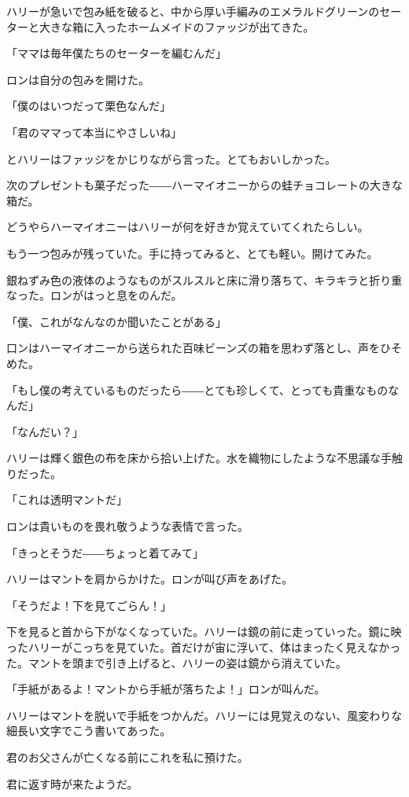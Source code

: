 \documentclass[10pt,a4paper]{article}
\begin{document}
\begin{CJK}{UTF8}{min}
ハリーが急いで包み紙を破ると、中から厚い手編みのエメラルドグリーンのセーターと大きな箱に入ったホームメイドのファッジが出てきた。

「ママは毎年僕たちのセーターを編むんだ」

ロンは自分の包みを開けた。

「僕のはいつだって栗色なんだ」

「君のママって本当にやさしいね」

とハリーはファッジをかじりながら言った。とてもおいしかった。

次のプレゼントも菓子だった――ハーマイオニーからの蛙チョコレートの大きな箱だ。

どうやらハーマイオニーはハリーが何を好きか覚えていてくれたらしい。

もう一つ包みが残っていた。手に持ってみると、とても軽い。開けてみた。

銀ねずみ色の液体のようなものがスルスルと床に滑り落ちて、キラキラと折り重なった。ロンがはっと息をのんだ。

「僕、これがなんなのか聞いたことがある」

口ンはハーマイオニーから送られた百味ビーンズの箱を思わず落とし、声をひそめた。

「もし僕の考えているものだったら――とても珍しくて、とっても貴重なものなんだ」

「なんだい？」

ハリーは輝く銀色の布を床から拾い上げた。水を織物にしたような不思議な手触りだった。

「これは透明マントだ」

ロンは貴いものを畏れ敬うような表情で言った。

「きっとそうだ――ちょっと着てみて」

ハリーはマントを肩からかけた。ロンが叫び声をあげた。

「そうだよ！下を見てごらん！」

下を見ると首から下がなくなっていた。ハリーは鏡の前に走っていった。鏡に映ったハリーがこっちを見ていた。首だけが宙に浮いて、体はまったく見えなかった。マントを頭まで引き上げると、ハリーの姿は鏡から消えていた。

「手紙があるよ！マントから手紙が落ちたよ！」ロンが叫んだ。

ハリーはマントを脱いで手紙をつかんだ。ハリーには見覚えのない、風変わりな細長い文字でこう書いてあった。



君のお父さんが亡くなる前にこれを私に預けた。

君に返す時が来たようだ。


\end{CJK}
\end{document}
